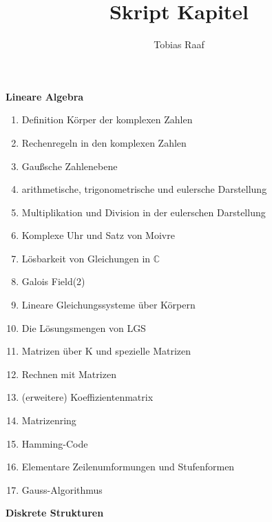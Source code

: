 \documentclass{scrartcl}
\title{Skript Kapitel}
\author{Tobias Raaf}
\begin{document}
	\large \textbf{Lineare Algebra}
\normalsize	\begin{enumerate}
		\item Definition Körper der komplexen Zahlen
		\item Rechenregeln in den komplexen Zahlen
		\item Gaußsche Zahlenebene
		\item arithmetische, trigonometrische und eulersche Darstellung
		\item Multiplikation und Division in der eulerschen Darstellung
		\item Komplexe Uhr und Satz von Moivre
		\item Lösbarkeit von Gleichungen in $\mathbb{C}$
		\item Galois Field(2)
		\item Lineare Gleichungssysteme über Körpern
		\item Die Lösungsmengen von LGS
		\item Matrizen über K und spezielle Matrizen
		\item Rechnen mit Matrizen
		\item (erweitere) Koeffizientenmatrix
		\item Matrizenring
		\item Hamming-Code
		\item Elementare Zeilenumformungen und Stufenformen
		\item Gauss-Algorithmus
		\end{enumerate}
		\large \textbf{Diskrete Strukturen}
\end{document}

